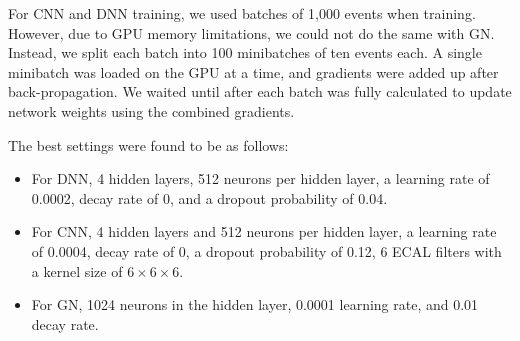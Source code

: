 For CNN and DNN training, we used batches of 1,000 events when training. However, due to GPU memory limitations, we could not do the same with GN. Instead, we split each batch into 100 minibatches of ten events each. A single minibatch was loaded on the GPU at a time, and gradients were added up after back-propagation. We waited until after each batch was fully calculated to update network weights using the combined gradients.

The best settings were found to be as follows:
\begin{itemize}
    \item For DNN, 4 hidden layers, 512 neurons per hidden layer, a learning rate of 0.0002, decay rate of 0, and a dropout probability of 0.04.
    \item For CNN, 4 hidden layers and 512 neurons per hidden layer, a learning rate of 0.0004, decay rate of 0, a dropout probability of 0.12, 6 ECAL filters with a kernel size of $6 \times 6 \times 6$.
    \item For GN, 1024 neurons in the hidden layer, 0.0001 learning rate, and 0.01 decay rate. 
\end{itemize}

